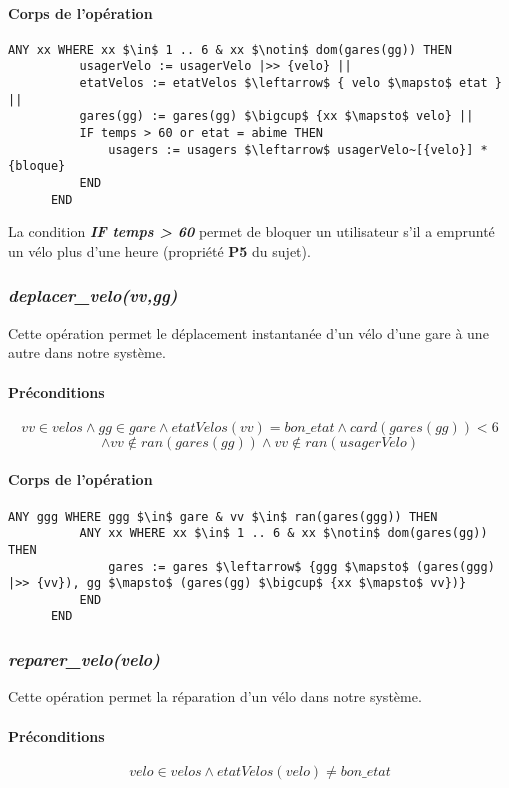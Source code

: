 \documentclass[12pt]{article}
\begin{document}
\paragraph{Corps de l'opération}
\textbf{}
\begin{lstlisting}[mathescape]
      ANY xx WHERE xx $\in$ 1 .. 6 & xx $\notin$ dom(gares(gg)) THEN
          usagerVelo := usagerVelo |>> {velo} ||
          etatVelos := etatVelos $\leftarrow$ { velo $\mapsto$ etat } ||
          gares(gg) := gares(gg) $\bigcup$ {xx $\mapsto$ velo} ||
          IF temps > 60 or etat = abime THEN
              usagers := usagers $\leftarrow$ usagerVelo~[{velo}] * {bloque}
          END
      END
\end{lstlisting}
La condition \textit{\textbf{IF temps > 60}} permet de bloquer un utilisateur s'il a emprunté un vélo plus d'une heure (propriété \textbf{P5} du sujet).
\subsubsection{\textit{deplacer\_velo(vv,gg)}}
Cette opération permet le déplacement instantanée d'un vélo d'une gare à une autre dans notre système.
\paragraph{Préconditions}
\[ vv \in velos \land gg \in gare \land etatVelos(vv) = bon\_etat \land card(gares(gg))<6 \]
\[\land vv \notin ran(gares(gg)) \land vv \notin ran(usagerVelo)\]
\paragraph{Corps de l'opération}
\textbf{}
\begin{lstlisting}[mathescape]
      ANY ggg WHERE ggg $\in$ gare & vv $\in$ ran(gares(ggg)) THEN
          ANY xx WHERE xx $\in$ 1 .. 6 & xx $\notin$ dom(gares(gg)) THEN
              gares := gares $\leftarrow$ {ggg $\mapsto$ (gares(ggg) |>> {vv}), gg $\mapsto$ (gares(gg) $\bigcup$ {xx $\mapsto$ vv})}
          END
      END
\end{lstlisting}

\subsubsection{\textit{reparer\_velo(velo)}}
Cette opération permet la réparation d'un vélo dans notre système.
\paragraph{Préconditions}
\[ velo \in velos \land etatVelos(velo) \neq bon\_etat \]
\end{document}
